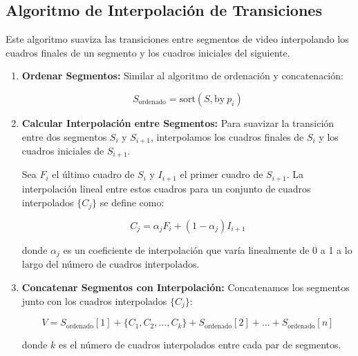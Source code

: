 \documentclass{article}
\begin{document}
\subsection*{Algoritmo de Interpolación de Transiciones}

Este algoritmo suaviza las transiciones entre segmentos de video interpolando los cuadros finales de un segmento y los cuadros iniciales del siguiente.

\begin{enumerate}
    \item \textbf{Ordenar Segmentos:} Similar al algoritmo de ordenación y concatenación:
    
    \[
    S_{\text{ordenado}} = \text{sort}(S, \text{by} \ p_i)
    \]
    
    \item \textbf{Calcular Interpolación entre Segmentos:} Para suavizar la transición entre dos segmentos \( S_i \) y \( S_{i+1} \), interpolamos los cuadros finales de \( S_i \) y los cuadros iniciales de \( S_{i+1} \).
    
    Sea \( F_i \) el último cuadro de \( S_i \) y \( I_{i+1} \) el primer cuadro de \( S_{i+1} \). La interpolación lineal entre estos cuadros para un conjunto de cuadros interpolados \( \{C_j\} \) se define como:
    
    \[
    C_j = \alpha_j F_i + (1 - \alpha_j) I_{i+1}
    \]
    
    donde \( \alpha_j \) es un coeficiente de interpolación que varía linealmente de 0 a 1 a lo largo del número de cuadros interpolados.
    
    \item \textbf{Concatenar Segmentos con Interpolación:} Concatenamos los segmentos junto con los cuadros interpolados \( \{C_j\} \):
    
    \[
    V = S_{\text{ordenado}}[1] + \{C_1, C_2, \ldots, C_k\} + S_{\text{ordenado}}[2] + \ldots + S_{\text{ordenado}}[n]
    \]
    
    donde \( k \) es el número de cuadros interpolados entre cada par de segmentos.
\end{enumerate}
\end{document}
